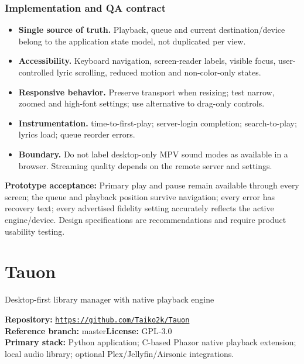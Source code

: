 \documentclass[10pt,a4paper,oneside]{report}
\newcommand{\sourceurl}[1]{\href{#1}{\texttt{\nolinkurl{#1}}}}
\begin{document}
\subsection*{Implementation and QA contract}
\begin{itemize}[leftmargin=*,itemsep=2pt,topsep=2pt]
\item \textbf{Single source of truth.} Playback, queue and current destination/device belong to the application state model, not duplicated per view.
\item \textbf{Accessibility.} Keyboard navigation, screen-reader labels, visible focus, user-controlled lyric scrolling, reduced motion and non-color-only states.
\item \textbf{Responsive behavior.} Preserve transport when resizing; test narrow, zoomed and high-font settings; use alternative to drag-only controls.
\item \textbf{Instrumentation.} time-to-first-play; server-login completion; search-to-play; lyrics load; queue reorder errors.
\item \textbf{Boundary.} Do not label desktop-only MPV sound modes as available in a browser. Streaming quality depends on the remote server and settings.
\end{itemize}
\vspace{2mm}\begin{evidencebox}\small\textbf{Prototype acceptance:} Primary play and pause remain available through every screen; the queue and playback position survive navigation; every error has recovery text; every advertised fidelity setting accurately reflects the active engine/device. Design specifications are recommendations and require product usability testing.\end{evidencebox}
\clearpage
\chapter{Tauon}
{\large\color{muted}Desktop-first library manager with native playback engine}\par
\begin{evidencebox}\small\textbf{Repository:} \sourceurl{https://github.com/Taiko2k/Tauon}\\\textbf{Reference branch:} master\qquad \textbf{License:} GPL-3.0\\\textbf{Primary stack:} Python application; C-based Phazor native playback extension; local audio library; optional Plex/Jellyfin/Airsonic integrations.\end{evidencebox}
\end{document}
